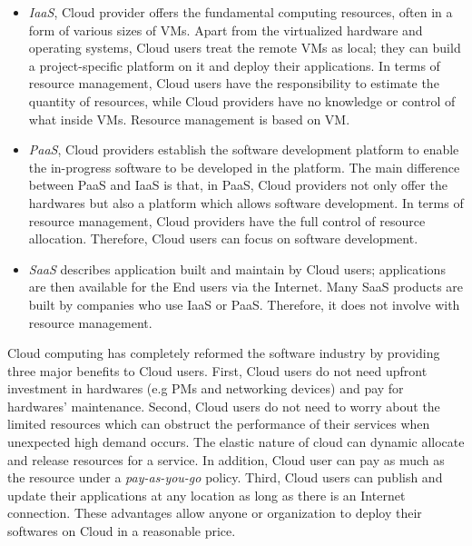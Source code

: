 \begin{itemize}
 	\item \emph{IaaS}, Cloud provider offers the fundamental computing resources, often in a form of various sizes of VMs. Apart from the virtualized hardware and operating systems, Cloud users treat the remote VMs as local; they can build a project-specific platform on it and deploy their applications. In terms of resource management, Cloud users have the responsibility to estimate the quantity of resources, while Cloud providers have no knowledge or control of what inside VMs. Resource management is based on VM. 
  	
  	\item \emph{PaaS}, Cloud providers establish the software development platform to enable the in-progress software to be developed in the platform.  The main difference between PaaS and IaaS is that, in PaaS, Cloud providers not only offer the hardwares but also a platform which allows software development. In terms of resource management, Cloud providers have the full control of resource allocation. Therefore, Cloud users can focus on software development.
  	
  	\item \emph{SaaS} describes application built and maintain by Cloud users; applications are then available for the End users via the Internet. Many SaaS products are built by companies who use IaaS or PaaS. Therefore, it does not involve with resource management. 
\end{itemize}

Cloud computing has completely reformed the software industry \cite{Buyya:2009ix} by providing three major benefits to Cloud users.
First, Cloud users do not need upfront investment in hardwares (e.g PMs and networking devices) and pay for hardwares' maintenance. 
Second, Cloud users do not need to worry about the limited resources which can obstruct the performance of their services when unexpected high demand occurs. The elastic nature of cloud can dynamic allocate and release resources for a service. In addition, Cloud user can pay as much as the resource under a \emph{pay-as-you-go} policy.
Third, Cloud users can publish and update their applications at any location 
as long as there is an Internet connection. 
These advantages allow anyone or organization to deploy their softwares on Cloud in
a reasonable price. 


